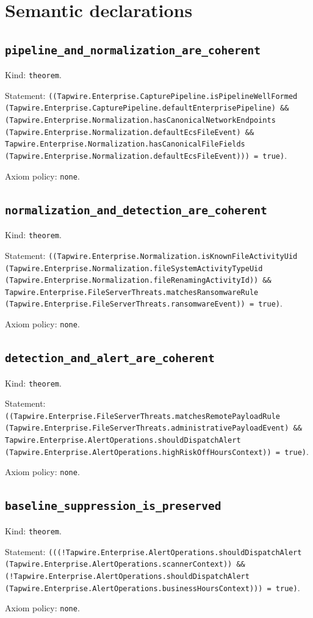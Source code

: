 \documentclass[11pt]{article}
\begin{document}
\section*{Semantic declarations}
\subsection*{\texttt{pipeline\_and\_normalization\_are\_coherent}}
\noindent Kind: \texttt{theorem}.\par
\noindent Statement: \texttt{((Tapwire.Enterprise.CapturePipeline.isPipelineWellFormed (Tapwire.Enterprise.CapturePipeline.defaultEnterprisePipeline) \&\& (Tapwire.Enterprise.Normalization.hasCanonicalNetworkEndpoints (Tapwire.Enterprise.Normalization.defaultEcsFileEvent) \&\& Tapwire.Enterprise.Normalization.hasCanonicalFileFields (Tapwire.Enterprise.Normalization.defaultEcsFileEvent))) = true)}.\par
\noindent Axiom policy: \texttt{none}.\par
\subsection*{\texttt{normalization\_and\_detection\_are\_coherent}}
\noindent Kind: \texttt{theorem}.\par
\noindent Statement: \texttt{((Tapwire.Enterprise.Normalization.isKnownFileActivityUid (Tapwire.Enterprise.Normalization.fileSystemActivityTypeUid (Tapwire.Enterprise.Normalization.fileRenamingActivityId)) \&\& Tapwire.Enterprise.FileServerThreats.matchesRansomwareRule (Tapwire.Enterprise.FileServerThreats.ransomwareEvent)) = true)}.\par
\noindent Axiom policy: \texttt{none}.\par
\subsection*{\texttt{detection\_and\_alert\_are\_coherent}}
\noindent Kind: \texttt{theorem}.\par
\noindent Statement: \texttt{((Tapwire.Enterprise.FileServerThreats.matchesRemotePayloadRule (Tapwire.Enterprise.FileServerThreats.administrativePayloadEvent) \&\& Tapwire.Enterprise.AlertOperations.shouldDispatchAlert (Tapwire.Enterprise.AlertOperations.highRiskOffHoursContext)) = true)}.\par
\noindent Axiom policy: \texttt{none}.\par
\subsection*{\texttt{baseline\_suppression\_is\_preserved}}
\noindent Kind: \texttt{theorem}.\par
\noindent Statement: \texttt{(((!Tapwire.Enterprise.AlertOperations.shouldDispatchAlert (Tapwire.Enterprise.AlertOperations.scannerContext)) \&\& (!Tapwire.Enterprise.AlertOperations.shouldDispatchAlert (Tapwire.Enterprise.AlertOperations.businessHoursContext))) = true)}.\par
\noindent Axiom policy: \texttt{none}.\par
\end{document}
